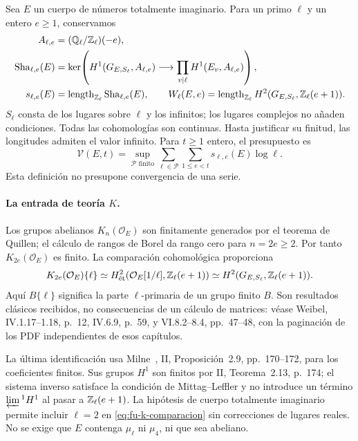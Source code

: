 Sea $E$ un cuerpo de números totalmente imaginario. Para un primo
$\ell$ y un entero $e\ge1$, conservamos
\begin{equation}
 \begin{aligned}
 A_{\ell,e}&=(\mathbb{Q}_\ell/\mathbb{Z}_\ell)(-e),\\
 \operatorname{Sha}_{\ell,e}(E)
 &=\ker\!\left(H^1(G_{E,S_\ell},A_{\ell,e})
       \longrightarrow\prod_{v\mid\ell}H^1(E_v,A_{\ell,e})\right),\\
 s_{\ell,e}(E)&=\operatorname{length}_{\mathbb{Z}_\ell}\operatorname{Sha}_{\ell,e}(E),\qquad
 W_\ell(E,e)=\operatorname{length}_{\mathbb{Z}_\ell}H^2(G_{E,S_\ell},\mathbb{Z}_\ell(e+1)).
 \end{aligned}
 \label{eq:fu-grupos}
\end{equation}
$S_\ell$ consta de los lugares sobre $\ell$ y los infinitos;
los lugares complejos no añaden condiciones.
Todas las cohomologías son continuas.
Hasta justificar su finitud, las longitudes admiten el valor infinito.
Para $t\ge1$ entero, el presupuesto es
\begin{equation}
 \mathcal V(E,t)
 =\sup_{\mathcal P\text{ finito}}
   \sum_{\ell\in\mathcal P}\sum_{1\le e<t}
       s_{\ell,e}(E)\log\ell.
 \label{eq:fu-presupuesto}
\end{equation}
Esta definición no presupone convergencia de una serie.

\paragraph{La entrada de teoría $K$.}
Los grupos abelianos $K_n(\mathcal O_E)$ son finitamente generados
por el teorema de Quillen; el cálculo de rangos de Borel da rango
cero para $n=2e\ge2$. Por tanto $K_{2e}(\mathcal O_E)$ es finito.
La comparación cohomológica proporciona
\begin{equation}
 K_{2e}(\mathcal O_E)\{\ell\}
 \simeq H^2_{\mathrm{\acute et}}
       (\mathcal O_E[1/\ell],\mathbb{Z}_\ell(e+1))
 \simeq H^2(G_{E,S_\ell},\mathbb{Z}_\ell(e+1)).
 \label{eq:fu-k-comparacion}
\end{equation}
Aquí $B\{\ell\}$ significa la parte $\ell$-primaria de un grupo
finito $B$. Son resultados clásicos recibidos, no consecuencias
de un cálculo de matrices: véase Weibel, IV.1.17--1.18, p.~12,
IV.6.9, p.~59, y VI.8.2--8.4, pp.~47--48, con la paginación
de los PDF independientes de esos capítulos.

La última identificación usa Milne~\cite{milne-dualidad},
II, Proposición~2.9, pp.~170--172, para los coeficientes finitos.
Sus grupos $H^1$ son finitos por II, Teorema~2.13, p.~174;
el sistema inverso satisface la condición de Mittag--Leffler y
no introduce un término $\varprojlim{}^1 H^1$ al pasar a
$\mathbb{Z}_\ell(e+1)$. La hipótesis de cuerpo totalmente imaginario
permite incluir $\ell=2$ en \eqref{eq:fu-k-comparacion} sin
correcciones de lugares reales. No se exige que $E$ contenga
$\mu_\ell$ ni $\mu_4$, ni que sea abeliano.

